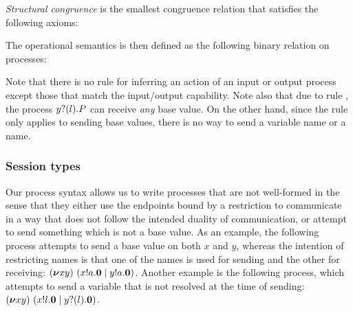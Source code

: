 
\emph{Structural congruence} is the smallest congruence relation that satisfies the following axioms:

The operational semantics is then defined as the following binary relation on processes:
Note that there is no rule for inferring an action of an input or output process except those that match the input/output capability.
Note also that due to rule , the process \( y ? (l) . P \) can receive \emph{any} base value.
On the other hand, since the rule  only applies to sending base values, there is no way to send a variable name or a name.

\subsubsection{Session types}
Our process syntax allows us to write processes that are not well-formed in the sense that they either use the endpoints bound by a restriction to communicate in a way that does not follow the intended duality of communication, or attempt to send something which is not a base value.
As an example, the following process attempts to send a base value on both \( x \) and \( y\), whereas the intention of restricting names is that one of the names is used for sending and the other for receiving: \( (\bm{\nu} xy)~(x ! a . \bm{0} \mid y ! a . \bm{0}) \).
Another example is the following process, which attempts to send a variable that is not resolved at the time of sending: \( (\bm{\nu} xy)~(x ! l . \bm{0} \mid y ? (l) . \bm{0}) \).

